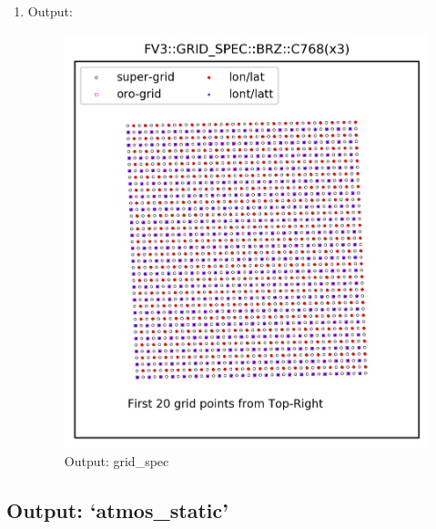 \documentclass[11pt,fleqn]{report}              %
\begin{document}
\begin{enumerate}
\item Output:

\begin{figure}[ht!]
  \centering
  \includegraphics[width=0.45\linewidth]{fv3_out_grdspec_BRZ_C768.png}
  \caption{Output: grid\_spec}
  \label{fig:py_out_gridspec}
\end{figure}

\end{enumerate}



\subsection{Output: `atmos\_static'}
\end{document}
